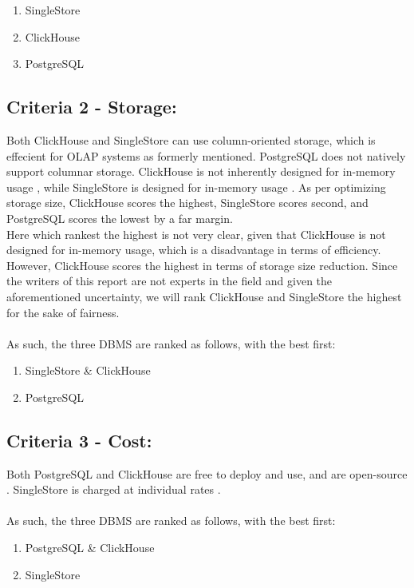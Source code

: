 \begin{enumerate}
    \item SingleStore
    \item ClickHouse
    \item PostgreSQL
\end{enumerate}
\subsection{Criteria 2 - Storage:}
Both ClickHouse and SingleStore can use column-oriented storage, which is effecient for OLAP systems as formerly mentioned. PostgreSQL does not natively support columnar storage.
ClickHouse is not inherently designed for in-memory usage \cite{clickhouseStorage}, while SingleStore is designed for in-memory usage \cite{singlestoreStorage}.
As per optimizing storage size, ClickHouse scores the highest, SingleStore scores second, and PostgreSQL scores the lowest by a  far margin.
\\
Here which rankest the highest is not very clear, given that ClickHouse is not designed for in-memory usage, which is a disadvantage in terms of efficiency. However, ClickHouse scores the highest in terms of storage size reduction.
Since the writers of this report are not experts in the field and given the aforementioned uncertainty, we will rank ClickHouse and SingleStore the highest for the sake of fairness. 
\\\\
As such, the three DBMS are ranked as follows, with the best first:

\begin{enumerate}
    \item SingleStore \& ClickHouse
    \item PostgreSQL
\end{enumerate}
\subsection{Criteria 3 - Cost:}
Both PostgreSQL and ClickHouse are free to deploy and use, and are open-source \cite{clickhouseCost} \cite{postgresqlCost}. SingleStore is charged at individual rates \cite{singleStoreCost}.
\\\\
As such, the three DBMS are ranked as follows, with the best first:

\begin{enumerate}
    \item PostgreSQL \& ClickHouse
    \item SingleStore
\end{enumerate}
